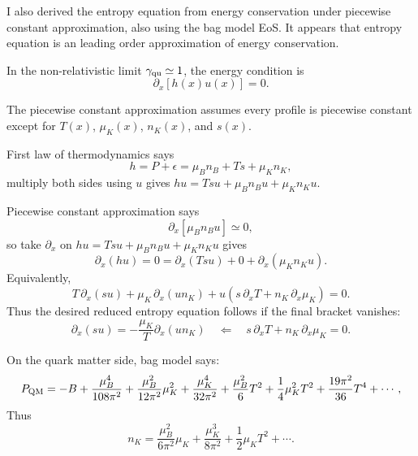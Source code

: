 \documentclass[11pt]{article}
\newcommand{\JS}[1]{{\color{violet}#1}}
\begin{document}
\JS{
I also derived the entropy equation from energy conservation under piecewise constant approximation, also using the bag model EoS. It appears that entropy equation is an leading order approximation of energy conservation. 

In the non-relativistic limit \(\gamma_{\rm qu}\simeq 1\), the energy condition is
\begin{equation}
\partial_x\left[h(x)u(x)\right]=0.
\end{equation}

The piecewise constant approximation assumes every profile is piecewise constant except for
\(T(x)\), \(\mu_K(x)\), \(n_K(x)\), and \(s(x)\). 

First law of thermodynamics says
\begin{equation}
h = P+\epsilon=\mu_B n_B+Ts+\mu_K n_K ,
\end{equation}
multiply both sides using $u$ gives $hu = Tsu + \mu_Bn_Bu + \mu_Kn_Ku$.

Piecewise constant approximation says
\begin{equation}
\partial_x\left[\mu_B n_B u\right]\simeq0,
\end{equation}
so take $\partial_x$ on $hu = Tsu + \mu_B n_B u + \mu_K n_K u$ gives
\begin{equation}
\partial_x(hu) = 0 =
\partial_x(Tsu)
+ 0 +
\partial_x(\mu_K n_K u).
\end{equation}
Equivalently,
\begin{equation}
T\,\partial_x(su)
+
\mu_K\,\partial_x(un_K)
+
u\left(s\,\partial_xT+n_K\,\partial_x\mu_K\right)
=0.
\end{equation}
Thus the desired reduced entropy equation follows if the final bracket
vanishes:
\begin{equation}
\partial_x(su)
=
-\frac{\mu_K}{T}\partial_x(un_K)
\quad\Leftarrow \quad
s\,\partial_xT+n_K\,\partial_x\mu_K=0.
\end{equation}

On the quark matter side, bag model says:
\begin{equation}
P_{\rm QM}
=
-B+\frac{\mu_B^4}{108\pi^2}
+
\frac{\mu_B^2}{12\pi^2}\mu_K^2
+
\frac{\mu_K^4}{32\pi^2}
+
\frac{\mu_B^2}{6}T^2
+
\frac{1}{4}\mu_K^2T^2
+
\frac{19\pi^2}{36}T^4
+\cdots ,
\end{equation} 
Thus
\begin{equation}
n_K
=
\frac{\mu_B^2}{6\pi^2}\mu_K
+
\frac{\mu_K^3}{8\pi^2}
+
\frac{1}{2}\mu_KT^2
+\cdots .
\end{equation}

}
\end{document}
